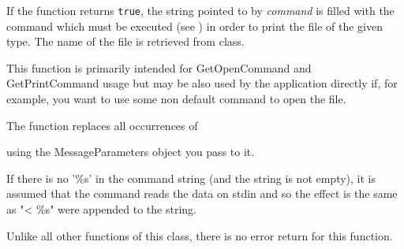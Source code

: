 If the function returns {\tt true}, the string pointed to by {\it command} is filled
with the command which must be executed (see ) in
order to print the file of the given type. The name of the file is
retrieved from  class.

\label{wxfiletypeexpandcommand}


This function is primarily intended for GetOpenCommand and GetPrintCommand
usage but may be also used by the application directly if, for example, you want
to use some non default command to open the file.

The function replaces all occurrences of

\twocolwidtha{7cm}
\begin{twocollist}\itemsep=0pt
\end{twocollist}

using the MessageParameters object you pass to it.

If there is no '\%s' in the command string (and the string is not empty), it is
assumed that the command reads the data on stdin and so the effect is the same
as "< \%s" were appended to the string.

Unlike all other functions of this class, there is no error return for this
function.

